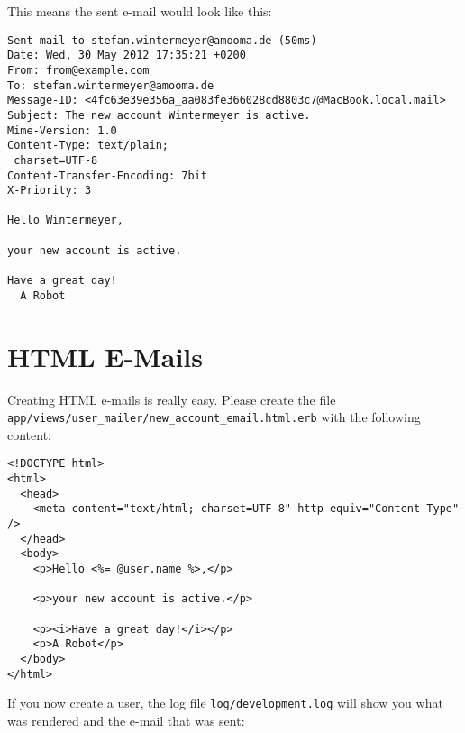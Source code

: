 \documentclass[a4paper]{book}
\begin{document}
This means the sent e-mail would look like this:

\begin{shaded}\begin{verbatim}
Sent mail to stefan.wintermeyer@amooma.de (50ms)
Date: Wed, 30 May 2012 17:35:21 +0200
From: from@example.com
To: stefan.wintermeyer@amooma.de
Message-ID: <4fc63e39e356a_aa083fe366028cd8803c7@MacBook.local.mail>
Subject: The new account Wintermeyer is active.
Mime-Version: 1.0
Content-Type: text/plain;
 charset=UTF-8
Content-Transfer-Encoding: 7bit
X-Priority: 3

Hello Wintermeyer,

your new account is active.

Have a great day!
  A Robot
\end{verbatim}\end{shaded}

\section{HTML E-Mails}\label{html-e-mails}

Creating HTML e-mails is really easy. Please create the file \texttt{app/views/user\_mailer/new\_account\_email.html.erb} with the following content:

\begin{shaded}\begin{verbatim}
<!DOCTYPE html>
<html>
  <head>
    <meta content="text/html; charset=UTF-8" http-equiv="Content-Type" />
  </head>
  <body>
    <p>Hello <%= @user.name %>,</p>

    <p>your new account is active.</p>

    <p><i>Have a great day!</i></p>
    <p>A Robot</p>
  </body>
</html>
\end{verbatim}\end{shaded}

If you now create a user, the log file \texttt{log/development.log} will show you what was rendered and the e-mail that was sent:
\end{document}
